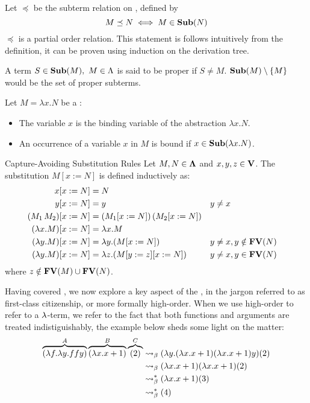 \documentclass[12pt]{book}
\begin{document}
\begin{remark}
  Let \( \preceq \) be the subterm relation on \lterms, defined by
  \[
    M \preceq N \iff M \in \mathbf{Sub}( N )
  \]
  \( \preceq \) is a partial order relation. This statement is follows intuitively from the definition, it can be proven using induction on the derivation tree.
\end{remark}
\begin{definition} A term $ S \in \mathbf{Sub}(M), \ M \in \Lambda$ is said to be proper if $S \neq M$. $\mathbf{Sub}(M) \setminus \{M\}$ would be the set of proper subterms.
\end{definition}
\begin{definition} Let \( M = \lambda x. N \) be a \lterm:
  \begin{itemize}
  \item The variable \( x \) is the binding variable of the abstraction \( \lambda x. N \).
  \item An occurrence of a variable \( x \) in \( M \) is bound if \( x \in \mathbf{Sub}( \lambda x. N ) \).
  \end{itemize}
\end{definition}

\begin{definition}Capture-Avoiding Substitution Rules
  Let \( M, N \in \mathbf{\Lambda} \) and \( x, y, z \in \mathbf{V} \). The substitution \( M[x := N] \) is defined inductively as:
  \[
    \begin{aligned}
      x[x := N]                       & = N \\
      y[x := N]                       & = y && y \neq x \\
      (M_1\, M_2)[x := N]             & = (M_1[x := N])\,(M_2[x := N]) \\
      (\lambda x. M)[x := N]          & = \lambda x. M \\
      (\lambda y. M)[x := N]          & = \lambda y. (M[x := N]) && y \neq x, y \notin \mathbf{FV}( N ) \\
      (\lambda y. M)[x := N]          & = \lambda z. (M[y := z][x := N]) && y \neq x, y \in \mathbf{FV}( N )
    \end{aligned}
  \]
  where \( z \notin \mathbf{FV}( M ) \cup \mathbf{FV}( N ) \).
\end{definition}


\newpage
Having covered \bred, we now explore a key aspect of the \lcalc, in the jargon referred to as first-class citizenship, or more formally high-order. When we use high-order to refer to a $\lambda$-term, we refer to the fact that both functions and arguments are treated indistiguishably, the example below sheds some light on the matter:
\begin{align*}
  \overbrace { (\lambda f . \lambda y . f f y) }^{A} \overbrace{ (\lambda x . x + 1) }^{B} \overbrace{(2)}^{C}
  &\mathrel{\leadsto}_\beta (\lambda y .(\lambda x . x + 1) (\lambda x . x + 1)y)(2) \\
  &\mathrel{\leadsto}_\beta (\lambda x . x + 1)(\lambda x . x + 1)(2) \\
  &\mathrel{\leadsto}_\beta^* (\lambda x . x + 1) (3) \\
  &\mathrel{\leadsto}_\beta^* (4)
\end{align*}
\end{document}
